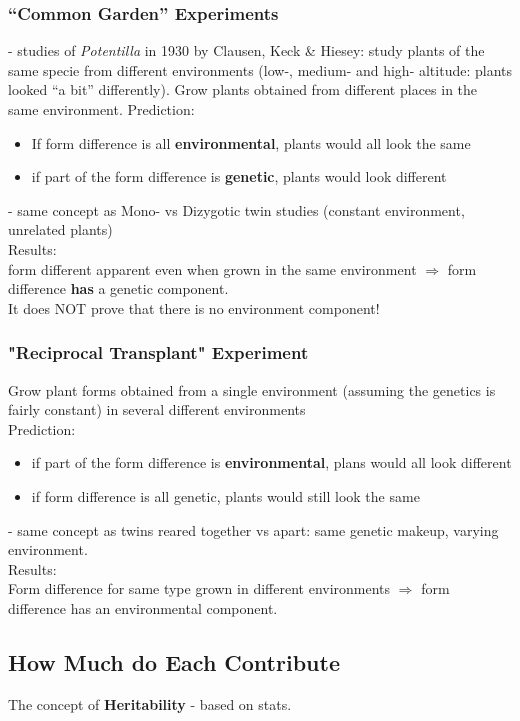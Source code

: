 \documentclass{scrartcl}
\begin{document}
\subsubsection{``Common Garden'' Experiments}
\label{sec:5-1-}
- studies of {\em Potentilla} in 1930 by Clausen, Keck \& Hiesey: study plants of the same specie from different environments (low-, medium- and high- altitude: plants looked ``a bit'' differently).
Grow plants obtained from different places in the same environment.
Prediction:
\begin{itemize}
\item If form difference is all {\bf environmental}, plants would all look the same
\item if part of the form difference is {\bf genetic}, plants would look different
\end{itemize}
- same concept as Mono- vs Dizygotic twin studies (constant environment, unrelated plants)\\
Results:\\
form different apparent even when grown in the same environment $\Rightarrow$ form difference {\bf has} a genetic component.\\
It does NOT prove that there is no environment component!
\subsubsection{"Reciprocal Transplant" Experiment}
\label{sec:5-1-1}
Grow plant forms obtained from a single environment (assuming the genetics is fairly constant) in several different environments\\
Prediction:
\begin{itemize}
\item if part of the form difference is {\bf environmental}, plans would all look different
\item if form difference is all genetic, plants would still look the same
\end{itemize}
- same concept as twins reared together vs apart: same genetic makeup, varying environment.\\
Results:\\
Form difference for same type grown in different environments $\Rightarrow$ form difference has an environmental component.

\subsection{How Much do Each Contribute}
\label{sec:5-2}
The concept of {\bf Heritability} - based on stats.
\end{document}
